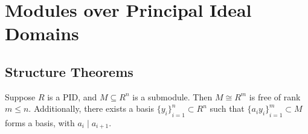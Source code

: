 \section{Modules over Principal Ideal Domains}

\subsection*{Structure Theorems}

\begin{theorem}\label{thm:pid-submodule-free}
    Suppose \(R\) is a PID,
    and \(M \subseteq R^n\) is a submodule.
    Then \(M \cong R^m\) is free of rank \(m \leq n\).
    Additionally, there exists a basis \({\{y_i\}}_{i=1}^n \subset R^n\)
    such that \({\{a_i y_i\}}_{i=1}^m \subset M\) forms a basis,
    with \(a_i \mid a_{i+1}\).
\end{theorem}
